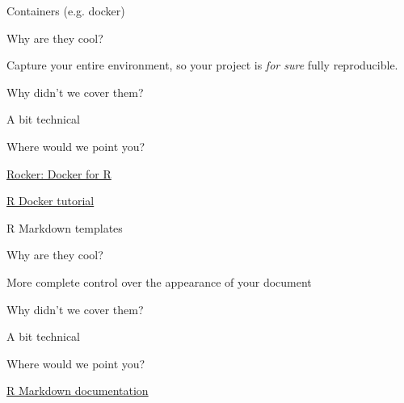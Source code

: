 \documentclass[12pt,t]{beamer}
\begin{document}
\begin{frame}[c]{Containers (e.g. docker)}

  \bbi
\item[] Why are they cool?
  \bi
  \item Capture your entire environment, so your project is \emph{for
    sure\/} fully reproducible.
  \ei
\item[] Why didn't we cover them?
    \bi
    \item A bit technical
    \ei
\item[] Where would we point you?
    \bi
  \item
    \href{https://ropensci.org/blog/blog/2014/10/23/introducing-rocker}{Rocker:
      Docker for R}
  \item \href{http://ropenscilabs.github.io/r-docker-tutorial/}{R
    Docker tutorial}
   \ei
\ei


\end{frame}











\begin{frame}[c]{R Markdown templates}

  \bbi
\item[] Why are they cool?
  \bi
  \item More complete control over the appearance of your document
  \ei
\item[] Why didn't we cover them?
    \bi
    \item A bit technical
    \ei
\item[] Where would we point you?
    \bi
  \item
    \href{http://rmarkdown.rstudio.com/developer_document_templates.html}{R
        Markdown documentation}
   \ei
\ei


\end{frame}
\end{document}
